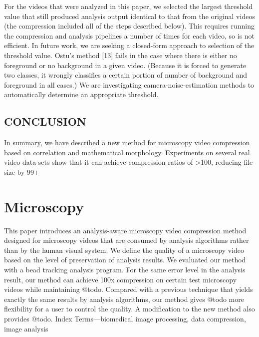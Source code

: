 For the videos that were analyzed in this paper, we selected the largest threshold value that still produced analysis output identical to that from the original videos (the compression included all of the steps described below).  This requires running the compression and analysis pipelines a number of times for each video, so is not efficient.
In future work, we are seeking a closed-form approach to selection of the threshold value.  Ostu’s method [13] fails in the case where there is either no foreground or no background in a given video.  (Because it is forced to generate two classes, it wrongly classifies a certain portion of number of background and foreground in all cases.)  We are investigating camera-noise-estimation methods to automatically determine an appropriate threshold.

\section{CONCLUSION}

In summary, we have described a new method for microscopy video compression based on correlation and mathematical morphology.  Experiments on several real video data sets show that it can achieve compression ratios of >100, reducing file size by 99+%


\chapter{Microscopy}

This paper introduces an analysis-aware microscopy video compression method designed for microscopy videos that are consumed by analysis algorithms rather than by the human visual system. We define the quality of a microscopy video based on the level of preservation of analysis results. We evaluated our method with a bead tracking analysis program. For the same error level in the analysis result, our method can achieve 100x compression on certain test microscopy videos while maintaining @todo. Compared with a previous technique that yields exactly the same results by analysis algorithms, our method gives @todo more flexibility for a user to control the quality.  A modification to the new method also provides @todo.
Index Terms—biomedical image processing, data compression, image analysis

